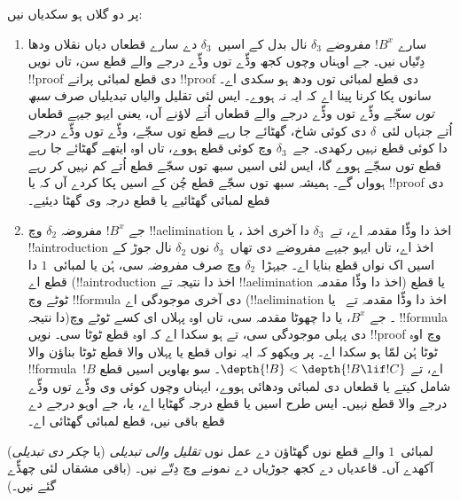 \documentclass[../../../include/open-logic-section]{subfiles}
\begin{document}
پر دو گلاں ہو سکدیاں نیں:
\begin{enumerate}
  \item سارے $!B^x$ مفروضے $ \delta_3$ نال بدل کے اسیں~$\delta_3$ دے سارے قطعاں دیاں نقلاں ودھا دِتّیاں نیں۔ جے اوہناں وچوں کجھ وڈّے توں وڈّے درجے والے قطع سن، تاں نویں !!{proof} دی قطع لمبائی پرانے !!{proof} دی قطع لمبائی توں ودھ ہو سکدی اے۔ سانوں پکا کرنا پینا اے کہ ایہ نہ ہووے۔ ایس لئی تقلیل والیاں تبدیلیاں صرف \emph{سبھ توں سجّے} وڈّے توں وڈّے درجے والے قطعاں اُتے لاؤنے آں، یعنی ایہو جیہے قطعاں اُتے جنہاں لئی~$\delta$ دی کوئی شاخ، گھٹائے جا رہے قطع توں سجّے، وڈّے توں وڈّے درجے دا کوئی قطع نہیں رکھدی۔ جے~$\delta_3$ وچ کوئی قطع ہووے، تاں اوہ ایتھے گھٹائے جا رہے قطع توں سجّے ہووے گا، ایس لئی اسیں سبھ توں سجّے قطع اُتے کم نہیں کر رہے ہوواں گے۔ ہمیشہ سبھ توں سجّے قطع چُن کے اسیں پکا کردے آں کہ یا !!{proof} دی قطع لمبائی گھٹائیے یا قطع درجہ وی گھٹا دیئیے۔
  \item جے $!B^x$ مفروضہ $ \delta_2$ وچ !!a{elimination} اخذ دا وڈّا مقدمہ اے، تے~$\delta_3$ دا آخری اخذ \Elim{\lor}، \Elim{\lexists} یا !!a{introduction} اخذ اے، تاں ایہو جیہے مفروضے دی تھاں~$\delta_3$ نوں $ \delta_2$ نال جوڑ کے اسیں اک نواں قطع بنایا اے۔ جیہڑا~$\delta_2$ وچ صرف مفروضہ سی، ہُن یا لمبائی~$1$ دا قطع اے (!!a{introduction} اخذ دا نتیجہ تے !!a{elimination} اخذ دا وڈّا مقدمہ) یا قطع ٹوٹے وچ !!{formula} دی آخری موجودگی اے (!!a{elimination} اخذ دا وڈّا مقدمہ تے~\Elim{\lor} یا \Elim{\lexists} دا نتیجہ)۔ جے $B^x$، \Elim{\lor} یا \Elim{\lexists} دا چھوٹا مقدمہ سی، تاں اوہ پہلاں ای کسے ٹوٹے وچ !!{formula} دی پہلی موجودگی سی، تے ہو سکدا اے کہ اوہ قطع ٹوٹا سی۔ نویں !!{proof} وچ اوہ ٹوٹا ہُن لمّا ہو سکدا اے۔ پر ویکھو کہ ایہ نواں قطع یا پہلاں والا قطع ٹوٹا بناؤن والا !!{formula}~$!B$ اے، تے $\depth{!B} < \depth{!B \lif !C}$۔ سو بھاویں اسیں قطع شامل کیتے یا قطعاں دی لمبائی ودھائی ہووے، ایہناں وچوں کوئی وی وڈّے توں وڈّے درجے والا قطع نہیں۔ ایس طرح اسیں یا قطع درجہ گھٹایا اے، یا، جے اوہو درجے دے قطع باقی نیں، قطع لمبائی گھٹائی اے۔
\end{enumerate}

لمبائی~$1$ والے قطع نوں گھٹاؤن دے عمل نوں \emph{تقلیل والی تبدیلی} (یا \emph{چکر دی تبدیلی}) آکھدے آں۔ قاعدیاں دے کجھ جوڑیاں دے نمونے  وچ دِتّے نیں۔ (باقی مشقاں لئی چھڈّے گئے نیں۔)
\end{document}
